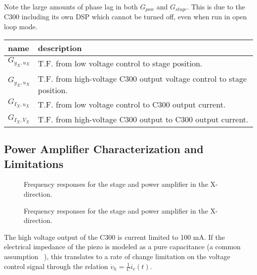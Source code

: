 \documentclass[journal,twocolumn,twoside]{IEEEtran/IEEEtran}
\begin{document}
Note the large amounts of phase lag in both $G_{pow}$ and $G_{stage}$. This is due to the C300 including its own DSP which cannot be turned off, even when run in open loop mode. 

\begin{table}
  \centering
  \begin{tabular}{ll}
    name & description\\
    \hline
    \(G_{y_{X},u_{X}}\) & \multirow{2}{2.5in}{T.F. from low voltage control to stage position.}\\
    &\\
    \(G_{y_{X},u_{X}}\) & \multirow{2}{2.5in}{T.F. from high-voltage C300 output voltage control to stage position.}\\
    &\\
    \(G_{I_{X},u_{X}}\) & \multirow{2}{2.5in}{T.F. from low voltage control to C300 output current.}\\
    &\\
    \(G_{I_{X},V_{X}}\) & \multirow{2}{2.5in}{T.F. from high-voltage C300 output to C300 output current.}\\
  \end{tabular}
  \label{tab:TFS}
\end{table}


\subsection{Power Amplifier Characterization and Limitations}\label{sec:powcharct}
\begin{figure*}[htbp]
  \begin{minipage}{0.48\textwidth}
\centering

\caption{\label{fig:org8f9b1d0}
Frequency responses for the stage and power amplifier in the X-direction.}
\end{minipage}
\hfill
\begin{minipage}{0.48\textwidth}
\centering

\caption{\label{fig:orgc576458}
  Frequency responses for the stage and power amplifier in the X-direction.}
\end{minipage}
\end{figure*}

The high voltage output of the C300 is current limited to 100 mA. If the electrical impedance of the piezo is modeled as a pure capacitance (a common assumption  ~\cite{fleming_megahertz_2009, Bazghaleh_digital_2013}), this translates to a rate of change limitation on the voltage control signal through the relation $\dot v_{h} = \frac{1}{C} i_c(t)$. 
\end{document}
